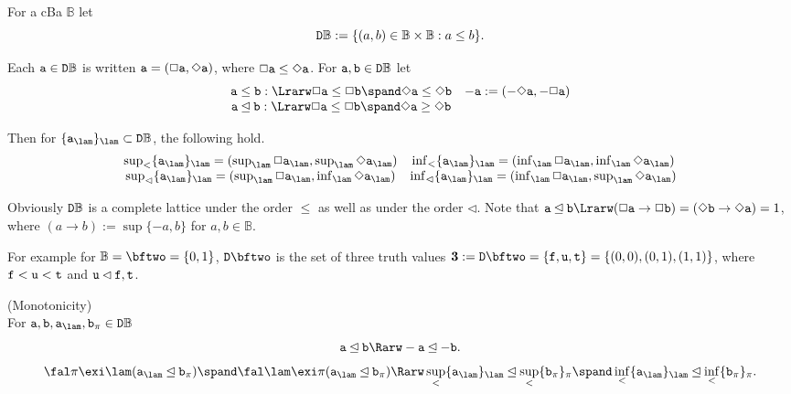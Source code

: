 \documentclass{article}
\newcommand{\bfthree}{\mbox{\boldmath$3$}}
\begin{document}
\bdf
{\rm For a cBa $\mathbb{B}$ let
\[
{\tt D}\mathbb{B}:=\{(a,b)\in\mathbb{B}\times\mathbb{B}: a\leq b\}.
\]

Each ${\tt a}\in {\tt D}\mathbb{B}$ is written
${\tt a}=(\Box{\tt a},\Diamond{\tt a})$, where $\Box{\tt a}\leq\Diamond{\tt a}$.
For ${\tt a}, {\tt b}\in{\tt D}\mathbb{B}$ let
\[
\begin{array}{cc}
{\tt a}\leq{\tt b}  :\Lrarw  \Box{\tt a}\leq\Box{\tt b} \spand \Diamond{\tt a}\leq\Diamond{\tt b}
&
-{\tt a} := (-\Diamond{\tt a},-\Box{\tt a})
\\
{\tt a}\unlhd{\tt b}  :\Lrarw  \Box{\tt a}\leq\Box{\tt b} \spand \Diamond{\tt a}\geq\Diamond{\tt b}
&
\end{array}
\]
}
\edf
Then for $\{{\tt a}_{\lam}\}_{\lam}\subset{\tt D}\mathbb{B}$, the following hold.
\[
\begin{array}{cc}
\sup_{<}\{{\tt a}_{\lam}\}_{\lam} = (\sup_{\lam}\Box{\tt a}_{\lam}, \sup_{\lam}\Diamond{\tt a}_{\lam})
&
\inf_{<}\{{\tt a}_{\lam}\}_{\lam} = (\inf_{\lam}\Box{\tt a}_{\lam}, \inf_{\lam}\Diamond{\tt a}_{\lam})
\\
\sup_{\lhd}\{{\tt a}_{\lam}\}_{\lam} = (\sup_{\lam}\Box{\tt a}_{\lam}, \inf_{\lam}\Diamond{\tt a}_{\lam})
&
\inf_{\lhd}\{{\tt a}_{\lam}\}_{\lam} = (\inf_{\lam}\Box{\tt a}_{\lam}, \sup_{\lam}\Diamond{\tt a}_{\lam})
\end{array}
\]

Obviously ${\tt D}\mathbb{B}$ is a complete lattice under the order $\leq$ as well as under the order $\lhd$.
Note that
${\tt a}\unlhd{\tt b}\Lrarw (\Box{\tt a}\to \Box{\tt b})= (\Diamond{\tt b}\to \Diamond{\tt a})=1$,
where $(a\to b):=\sup\{-a,b\}$ for $a,b\in\mathbb{B}$.

For example for $\mathbb{B}=\bftwo=\{0,1\}$,
${\tt D}\bftwo$ is the set of three truth values $\bfthree:={\tt D}\bftwo=\{{\tt f},{\tt u},{\tt t}\}=\{(0,0),(0,1),(1,1)\}$,
where ${\tt f}<{\tt u}<{\tt t}$ and
${\tt u}\lhd{\tt f}, {\tt t}$.

\bprp\label{prp:1}{\rm (Monotonicity)}\\
For ${\tt a},{\tt b},{\tt a}_{\lam},{\tt b}_{\pi}\in {\tt D}\mathbb{B}$
\[
{\tt a}\unlhd{\tt b}\Rarw -{\tt a}\unlhd -{\tt b}
.\]
\[
\fal\pi\exi\lam({\tt a}_{\lam}\unlhd{\tt b}_{\pi}) \spand
\fal\lam\exi\pi({\tt a}_{\lam}\unlhd{\tt b}_{\pi})
\Rarw
\sup_{<}\{{\tt a}_{\lam}\}_{\lam}\unlhd\sup_{<}\{{\tt b}_{\pi}\}_{\pi}
\spand 
\inf_{<}\{{\tt a}_{\lam}\}_{\lam}\unlhd\inf_{<}\{{\tt b}_{\pi}\}_{\pi}
.\]
\eprp
\end{document}
